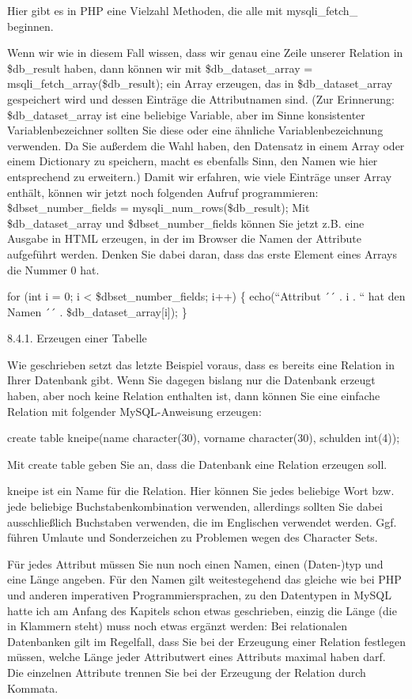 \begin{verbatimg}
Hier gibt es in PHP eine Vielzahl Methoden, die alle mit mysqli\_fetch\_ beginnen.

Wenn wir wie in diesem Fall wissen, dass wir genau eine Zeile unserer Relation in \$db\_result haben, dann können wir mit \$db\_dataset\_array = msqli\_fetch\_array(\$db\_result); ein Array erzeugen, das in \$db\_dataset\_array gespeichert wird und dessen Einträge die Attributnamen sind. (Zur Erinnerung: \$db\_dataset\_array ist eine beliebige Variable, aber im Sinne konsistenter Variablenbezeichner sollten Sie diese oder eine ähnliche Variablenbezeichnung verwenden. Da Sie außerdem die Wahl haben, den Datensatz in einem Array oder einem Dictionary zu speichern, macht es ebenfalls Sinn, den Namen wie hier entsprechend zu erweitern.)
Damit wir erfahren, wie viele Einträge unser Array enthält, können wir jetzt noch folgenden Aufruf programmieren: \$dbset\_number\_fields = mysqli\_num\_rows(\$db\_result);
Mit \$db\_dataset\_array und \$dbset\_number\_fields können Sie jetzt z.B. eine Ausgabe in HTML erzeugen, in der im Browser die Namen der Attribute aufgeführt werden. Denken Sie dabei daran, dass das erste Element eines Arrays die Nummer 0 hat.

for (int i = 0; i < \$dbset\_number\_fields; i++)
\{ echo(``Attribut ´´ . i . `` hat den Namen ´´ . \$db\_dataset\_array[i]); \}

8.4.1.	Erzeugen einer Tabelle

Wie geschrieben setzt das letzte Beispiel voraus, dass es bereits eine Relation in Ihrer Datenbank gibt. Wenn Sie dagegen bislang nur die Datenbank erzeugt haben, aber noch keine Relation enthalten ist, dann können Sie eine einfache Relation mit folgender MySQL-Anweisung erzeugen:

create table kneipe(name character(30), vorname character(30), schulden int(4));

Mit create table geben Sie an, dass die Datenbank eine Relation erzeugen soll.

kneipe ist ein Name für die Relation. Hier können Sie jedes beliebige Wort bzw. jede beliebige Buchstabenkombination verwenden, allerdings sollten Sie dabei ausschließlich Buchstaben verwenden, die im Englischen verwendet werden. Ggf. führen Umlaute und Sonderzeichen zu Problemen wegen des Character Sets.

Für jedes Attribut müssen Sie nun noch einen Namen, einen (Daten-)typ und eine Länge angeben. Für den Namen gilt weitestegehend das gleiche wie bei PHP und anderen imperativen Programmiersprachen, zu den Datentypen in MySQL hatte ich am Anfang des Kapitels schon etwas geschrieben, einzig die Länge (die in Klammern steht) muss noch etwas ergänzt werden: Bei relationalen Datenbanken gilt im Regelfall, dass Sie bei der Erzeugung einer Relation festlegen müssen, welche Länge jeder Attributwert eines Attributs maximal haben darf. Die einzelnen Attribute trennen Sie bei der Erzeugung der Relation durch Kommata.


\end{verbatimg}
